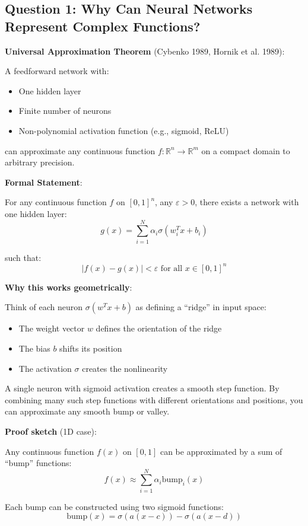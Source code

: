\documentclass[11pt,oneside]{book}
\begin{document}
\subsection{Question 1: Why Can Neural Networks Represent Complex Functions?}

\textbf{Universal Approximation Theorem} (Cybenko 1989, Hornik et al. 1989):

A feedforward network with:
\begin{itemize}
\item One hidden layer
\item Finite number of neurons
\item Non-polynomial activation function (e.g., sigmoid, ReLU)
\end{itemize}

can approximate any continuous function $f: \mathbb{R}^n \to \mathbb{R}^m$ on a compact domain to arbitrary precision.

\textbf{Formal Statement}:

For any continuous function $f$ on $[0,1]^n$, any $\varepsilon > 0$, there exists a network with one hidden layer:
\[
g(x) = \sum_{i=1}^N \alpha_i \sigma(w_i^T x + b_i)
\]

such that:
\[
|f(x) - g(x)| < \varepsilon  \text{ for all } x \in [0,1]^n
\]

\textbf{Why this works geometrically}:

Think of each neuron $\sigma(w^T x + b)$ as defining a ``ridge'' in input space:
\begin{itemize}
\item The weight vector $w$ defines the orientation of the ridge
\item The bias $b$ shifts its position
\item The activation $\sigma$ creates the nonlinearity
\end{itemize}

A single neuron with sigmoid activation creates a smooth step function. By combining many such step functions with different orientations and positions, you can approximate any smooth bump or valley.

\textbf{Proof sketch} (1D case):

Any continuous function $f(x)$ on $[0,1]$ can be approximated by a sum of ``bump'' functions:
\[
f(x) \approx \sum_{i=1}^N \alpha_i \text{bump}_i(x)
\]

Each bump can be constructed using two sigmoid functions:
\[
\text{bump}(x) = \sigma(a(x - c)) - \sigma(a(x - d))
\]
\end{document}
